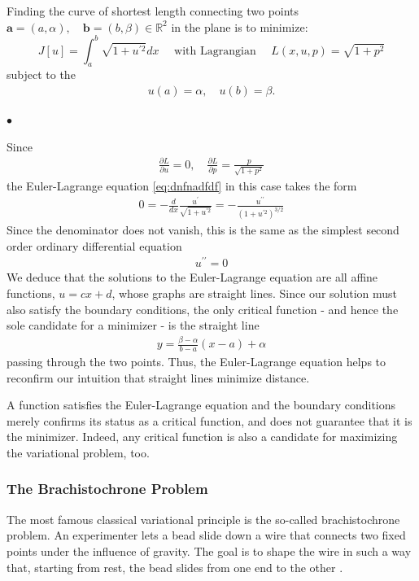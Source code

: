 \documentclass{article}
\begin{document}
Finding the curve of shortest length connecting two points $\mathbf{a}=(a, \alpha), \quad \mathbf{b}=(b, \beta) \in \mathbb{R}^{2}$ in the plane is to minimize:
$$\text{$J[u]=\int_{a}^{b} \sqrt{1+u^{\prime 2}} d x \quad$ with Lagrangian $\quad L(x, u, p)=\sqrt{1+p^{2}}$}$$
subject to the 
\begin{align*}
u(a)=\alpha, \quad u(b)=\beta .
\end{align*}

$\bullet$ 

Since
\begin{align*}
\frac{\partial L}{\partial u}=0, \quad \frac{\partial L}{\partial p}=\frac{p}{\sqrt{1+p^{2}}}
\end{align*}
the Euler-Lagrange equation \cref{eq:dnfnadfdf} in this case takes the form
\begin{align*}
0=-\frac{d}{d x} \frac{u^{\prime}}{\sqrt{1+u^{\prime 2}}}=-\frac{u^{\prime \prime}}{\left(1+u^{\prime 2}\right)^{3 / 2}}
\end{align*}
Since the denominator does not vanish, this is the same as the simplest second order ordinary differential equation
\begin{align}
u^{\prime \prime}=0 \label{eq:ccdf}
\end{align}
We deduce that the solutions to the Euler-Lagrange equation are all affine functions, $u=c x+d$, whose graphs are straight lines. Since our solution must also satisfy the boundary conditions, the only critical function - and hence the sole candidate for a minimizer - is the straight line
\begin{align*}
y=\frac{\beta-\alpha}{b-a}(x-a)+\alpha
\end{align*}
passing through the two points. Thus, the Euler-Lagrange equation helps to reconfirm our intuition that straight lines minimize distance.
\begin{rema}
A function satisfies the Euler-Lagrange equation and the boundary conditions merely confirms its status as a critical function, and does not guarantee that it is the minimizer. Indeed, any critical function is also a candidate for maximizing the variational problem, too.
\end{rema}
\subsubsection{The Brachistochrone Problem}
The most famous classical variational principle is the so-called brachistochrone problem. An experimenter lets a bead slide down a wire that connects two fixed points under the influence of gravity. The goal is to shape the wire in such a way that, starting from rest, the bead slides from one end to the other .
\end{document}
